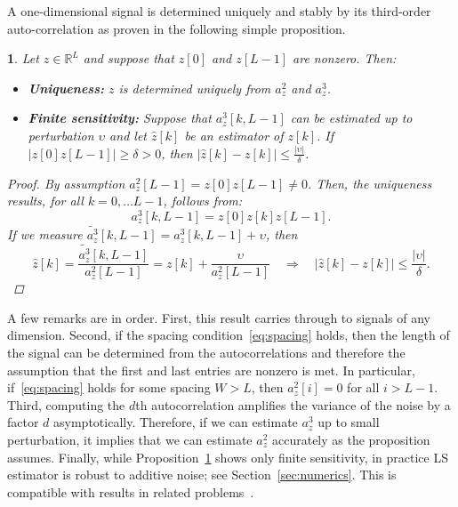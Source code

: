 \documentclass[english,11pt]{article}
\newcommand{\TODO}[1]{{\color{red}{[#1]}}}
\numberwithin{equation}{section}
\theoremstyle{plain}
\theoremstyle{definition}
\theoremstyle{remark}
\theoremstyle{plain}
\theoremstyle{remark}
\theoremstyle{plain}
\theoremstyle{plain}
\newtheorem{proposition}[thm]{\protect\propositionname}
\providecommand{\propositionname}{Proposition}
\newcommand{\RL}{\mathbb{R}^L}
\begin{document}
A one-dimensional signal is determined uniquely and stably by its third-order auto-correlation as proven in the following simple proposition.
\begin{proposition} \label{prop:uniqueness}
	Let $z\in\RL$ and suppose that $z[0]$ and $z[L-1]$ are nonzero. Then:
	\begin{itemize}
		\item \textbf{Uniqueness:} 	 $z$  is determined uniquely from  $a_z^2$ and $a_z^3$.
        \item \textbf{Finite sensitivity:} 	Suppose that  $a_z^3[k,L-1]$ can be estimated up to  perturbation $\upsilon$ and let $\hat{z}[k]$ be an estimator of $z[k]$. If $\vert z[0]z[L-1]\vert \geq \delta>0$, then $\vert \hat{z}[k] - z[k]\vert\leq \frac{\vert \upsilon\vert }{\delta}$. \TODO{That statement is incomplete: you mean there exists an estimator that guarantees this. (Since the estimator is very simple, we may want to show it explicitly in the proposition statement, and comment afterwards that of course this is still fairly sensitive, and we can do better.)}
	\end{itemize}
	\begin{proof}
		By assumption $a_z^2[L-1] = z[0]z[L-1]\neq 0$.
		Then, the uniqueness results, for all $k=0,\ldots L-1$,  follows from:
		\begin{equation*}
		a_z^3[k,L-1] = z[0]z[k]z[L-1].
		\end{equation*}
		If we measure $\tilde{a_z^3}[k,L-1] = a_z^3[k,L-1]+\upsilon$, then 
		\begin{equation*}
		\hat{z}[k] = \frac{\tilde{a_z^3}[k,L-1]}{a_z^2[L-1]} = z[k]+\frac{\upsilon}{a_z^2[L-1]} \quad \Rightarrow \quad \vert \hat{z}[k] - {z}[k]\vert \leq \frac{\vert\upsilon\vert}{\delta}.
		\end{equation*} 
	\end{proof}
\end{proposition}

A few remarks are in order. First, this result carries through to signals of any dimension.
Second, if the spacing condition~\eqref{eq:spacing} holds, then the length of the signal can be determined from the autocorrelations and 
therefore the assumption that the first and last entries are nonzero is met. In particular, if~\eqref{eq:spacing} holds for some spacing $W>L$, then $a_z^2[i]=0$ for all $i>L-1$.
Third, computing the $d$th autocorrelation amplifies the variance of the noise by a factor $d$ asymptotically. Therefore, if we can estimate $a_z^3$ up to small perturbation, it implies that we can estimate $a_z^2$ accurately as the proposition assumes. 
Finally, while Proposition~\ref{prop:uniqueness} shows only finite sensitivity, in practice LS estimator is robust to additive noise; see Section~\ref{sec:numerics}. This is compatible with results in related problems~\cite{bendory2017bispectrum,boumal2017heterogeneous}.
\end{document}
